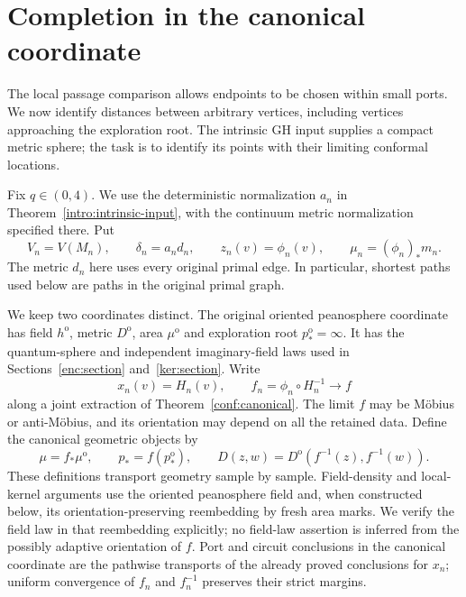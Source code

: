 \documentclass[11pt]{article}
\numberwithin{equation}{section}
\theoremstyle{definition}
\theoremstyle{remark}
\newcommand{\1}{\mathbf 1}
\begin{document}
\section{Completion in the canonical coordinate}
\label{comp:section}

The local passage comparison allows endpoints to be chosen within
small ports.  We now identify distances between arbitrary vertices,
including vertices approaching the exploration root.  The intrinsic
GH input supplies a compact metric sphere; the task is to identify
its points with their limiting conformal locations.

Fix $q\in(0,4)$.  We use the deterministic normalization $a_n$ in
Theorem~\ref{intro:intrinsic-input}, with the continuum metric
normalization specified there.  Put
\[
 V_n=V(M_n),\qquad \delta_n=a_n d_n,
 \qquad z_n(v)=\phi_n(v),\qquad
 \mu_n=(\phi_n)_*m_n.
\]
The metric $d_n$ here uses every original primal edge.  In particular,
shortest paths used below are paths in the original primal graph.

We keep two coordinates distinct.  The original oriented peanosphere
coordinate has field $h^{\mathrm o}$, metric $D^{\mathrm o}$, area
$\mu^{\mathrm o}$ and exploration root $p_*^{\mathrm o}=\infty$.
It has the quantum-sphere and independent imaginary-field laws used
in Sections~\ref{enc:section} and~\ref{ker:section}.  Write
\[
 x_n(v)=H_n(v),\qquad
 f_n=\phi_n\circ H_n^{-1}\longrightarrow f
\]
along a joint extraction of Theorem~\ref{conf:canonical}.  The limit
$f$ may be M\"obius or anti-M\"obius, and its orientation may depend
on all the retained data.  Define the canonical geometric objects by
\begin{equation}
 \label{comp:two-coordinates}
 \mu=f_*\mu^{\mathrm o},\qquad p_*=f(p_*^{\mathrm o}),\qquad
 D(z,w)=D^{\mathrm o}(f^{-1}(z),f^{-1}(w)).
\end{equation}
These definitions transport geometry sample by sample.  Field-density
and local-kernel arguments use the oriented peanosphere field and,
when constructed below, its orientation-preserving reembedding by
fresh area marks.  We verify the field law in that reembedding
explicitly; no field-law assertion is inferred from the possibly
adaptive orientation of $f$.  Port and circuit conclusions in the
canonical coordinate are the
pathwise transports of the already proved conclusions for $x_n$;
uniform convergence of $f_n$ and $f_n^{-1}$ preserves their strict
margins.
\end{document}
